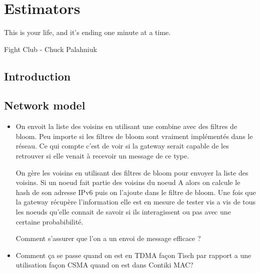 
\chapter{Estimators} %
\label{cha:estimators}

\epigraph{This is your life, and it's ending one minute at a time.}{Fight Club - Chuck Palahniuk}

\minitoc

\section{Introduction} %
\label{sec:estimators_introduction}

\lipsum


\section{Network model} %
\label{sec:estimators_network_model}

\lipsum

\begin{itemize}

    \item On envoit la liste des voisins en utilisant une combine avec des
      filtres de bloom. Peu importe si les filtres de bloom sont vraiment
      implémentés dans le réseau. Ce qui compte c'est de voir si la gateway
      serait capable de les retrouver si elle venait à recevoir un message de
      ce type.

      On gère les voisins en utilisant des filtres de bloom pour envoyer la
      liste des voisins. Si un noeud fait partie des voisins du noeud A alors
      on calcule le hash de son adresse IPv6 puis on l'ajoute dans le filtre
      de bloom. Une fois que la gateway récupère l'information elle est en
      mesure de tester vis a vis de tous les noeuds qu'elle connait de savoir
      si ils interagissent ou pas avec une certaine probabibilité.

      Comment s'assurer que l'on a un envoi de message efficace ?

      \item Comment ça se passe quand on est en TDMA façon Tisch par rapport
      a une utilisation façon CSMA quand on est dans Contiki MAC?

\end{itemize}

